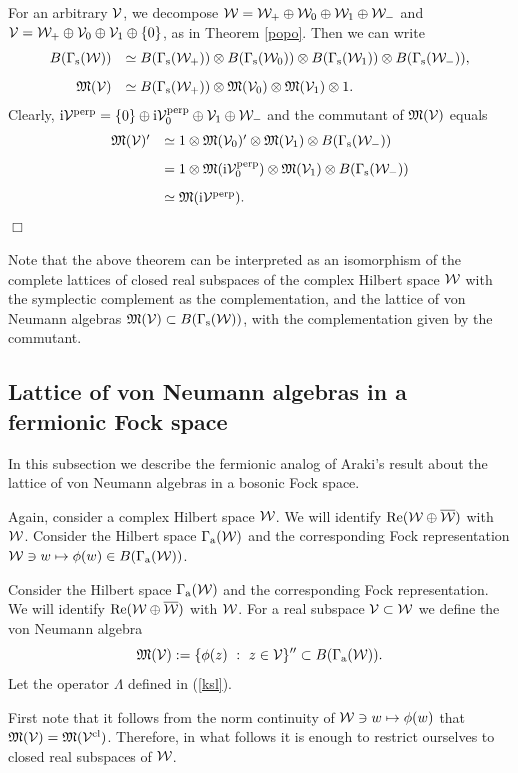 \documentclass{svmult}
\def\Re{{\rm Re}}
\def\cl{{\rm cl}}
\def\bar{\overline}
\def\perpr{{\rm perp}}
\def\s{{\rm s}}
\def\cV{{\cal V}}
\def\cW{{\cal W}}
\def\fM{{\mathfrak M}}
\def\a{{\rm a}}
\def\i{{\rm i}}
\def\qed{$\Box$\medskip}
\def\one{{\bf 1}}
\def\one{{ 1}}
\def\W{{\cal W}}
\def\s{{\rm s}}
\begin{document}
For an arbitrary $\cV$,
we decompose $\cW=\W_+\oplus\cW_0\oplus\cW_1\oplus
\cW_-$ and
$\cV=\cW_+\oplus\cV_0\oplus\cV_1\oplus\{0\}$,
as in  Theorem \ref{popo}.
Then we can write
\[\begin{array}{rl}
B(\Gamma_\s(\cW))&\simeq B(\Gamma_\s(\cW_+))\otimes B(\Gamma_\s(\cW_0))
\otimes B(\Gamma_\s(\cW_1))\otimes B(\Gamma_\s(\cW_-)),\\[3mm]
\fM(\cV)&\simeq B(\Gamma_\s(\cW_+))\otimes \fM(\cV_0)\otimes\fM(\cV_1)\otimes
 \one.
\end{array}\]
Clearly, $\i\cV^\perpr=\{0\}\oplus\i\cV_0^\perpr\oplus\cV_1
\oplus\cW_-$ and the commutant of 
$\fM(\cV)$ equals 
\[\begin{array}{rl}
\fM(\cV)'&\simeq \one\otimes\fM(\cV_0)'\otimes\fM(\cV_1)
\otimes B(\Gamma_\s(\cW_-))\\[3mm]
&= \one\otimes\fM(\i\cV_0^\perpr)\otimes\fM(\cV_1)
\otimes B(\Gamma_\s(\cW_-))\\[3mm]
&\simeq\fM(\i\cV^\perpr).\end{array}\]
\qed

Note that the above theorem can be interpreted as an isomorphism of the
 complete lattices of closed real subspaces of the complex Hilbert space $\cW$
 with the symplectic complement as the complementation, and the lattice of von
 Neumann algebras $\fM(\cV)\subset B(\Gamma_\s(\cW))$, with the
 complementation  given by the commutant.

\subsection{Lattice of von Neumann algebras in a fermionic Fock space}

In this subsection we describe the fermionic analog of Araki's result about
the lattice of von Neumann algebras in a bosonic Fock space.

Again, consider a complex Hilbert space $\cW$.
 We will identify $\Re(\cW\oplus\bar\cW)$ with $\cW$.
Consider the Hilbert space $\Gamma_\a(\cW)$ and the corresponding Fock
representation $\cW\ni w\mapsto \phi(w)\in
B(\Gamma_\a(\cW))$.

Consider the Hilbert space $\Gamma_\a(\cW)$ and the corresponding Fock
representation. We will identify $\Re(\cW\oplus\bar\cW)$ with $\cW$.
For a real subspace $\cV\subset\cW$ we define the von Neumann algebra
\[\fM(\cV):=\{\phi(z)\ :\ z\in\cV\}''\subset B(\Gamma_\a(\cW)).\]
Let  the operator $\Lambda$ defined in (\ref{ksl}).

First note that it follows from the norm continuity of $\cW
\ni w\mapsto \phi(w)$ that 
$\fM(\cV)=\fM(\cV^\cl)$. Therefore, in what follows it
is enough to restrict ourselves to closed real subspaces of $\cW$.
\end{document}
